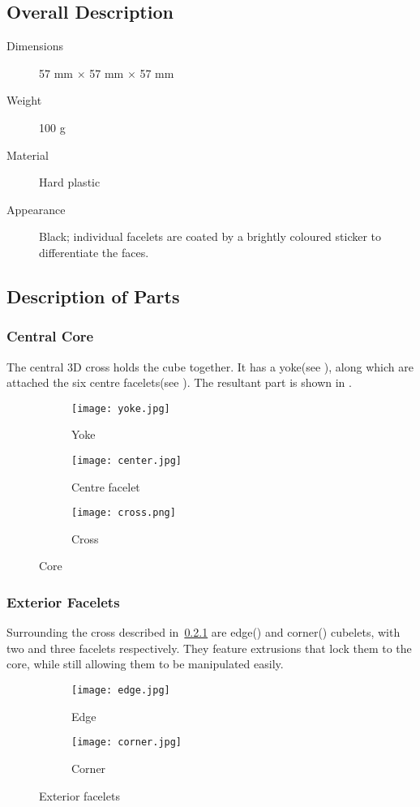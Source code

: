 \subsection{Overall Description}
\begin{description}
	\item[Dimensions] 57 mm ${\times}$ 57 mm ${\times}$ 57 mm
	\item[Weight]	100 g
	\item[Material] Hard plastic
	\item[Appearance] Black; individual facelets are coated by a brightly coloured sticker to differentiate the faces.
\end{description}
\subsection{Description of Parts}
	\subsubsection{Central Core}\label{part:cross}
		The central 3D cross holds the cube together. It has a yoke(see ), along which are attached the six centre facelets(see ). The resultant part is shown in .
		\begin{figure}[h]
			\centering
			\begin{subfigure}[b]{0.3\textwidth}
				\texttt{[image: yoke.jpg]}
				\caption{Yoke}\label{fig:yoke}
			\end{subfigure}
			\begin{subfigure}[b]{0.3\textwidth}
				\texttt{[image: center.jpg]}
				\caption{Centre facelet}\label{fig:centre}
			\end{subfigure}
			\begin{subfigure}[b]{0.3\textwidth}
				\texttt{[image: cross.png]}
				\caption{Cross}\label{fig:cross}
			\end{subfigure}
			\caption{Core}
		\end{figure}
	\subsubsection{Exterior Facelets}
		Surrounding the cross described in~\ref{part:cross} are edge() and corner() cubelets, with two and three facelets respectively. They feature extrusions that lock them to the core, while still allowing them to be manipulated easily.
		\begin{figure}[h]
			\centering
			\begin{subfigure}[b]{0.4\textwidth}
				\texttt{[image: edge.jpg]}
				\caption{Edge}\label{fig:edge}
			\end{subfigure}
			\begin{subfigure}[b]{0.4\textwidth}
				\texttt{[image: corner.jpg]}
				\caption{Corner}\label{fig:corner}
			\end{subfigure}
			\caption{Exterior facelets}
		\end{figure}